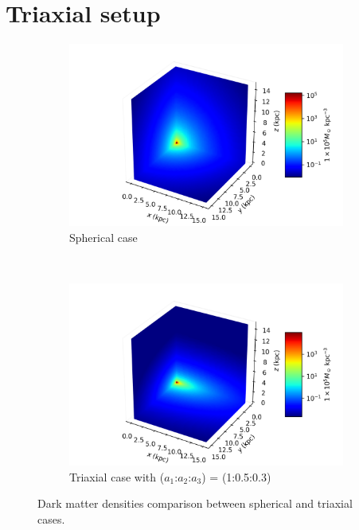 	\section{Triaxial setup}
		\begin{figure}[h]
			\centering
			\begin{subfigure}[b]{0.49\textwidth}
				\includegraphics[width = \textwidth]{"../Files/Week 7/symmetric"}
				\caption{Spherical case}
				\label{fig: symmetricDensity3d}
			\end{subfigure}
			~ 
			\begin{subfigure}[b]{0.49\textwidth}
				\includegraphics[width=\textwidth]{"../Files/Week 7/triaxial"}
				\caption{Triaxial case with ($a_1$:$a_2$:$a_3$) = (1:0.5:0.3)}
				\label{fig: triaxialDensity3d}
			\end{subfigure}
			\caption{Dark matter densities comparison between spherical and triaxial cases.}
			\label{fig: symmetricTriaxial}
		\end{figure}
	

